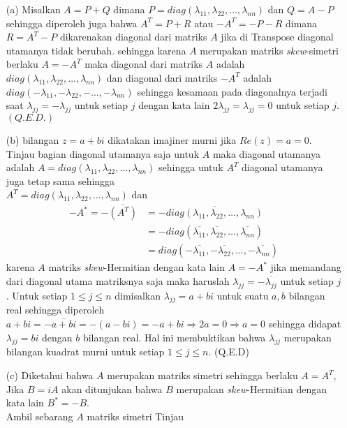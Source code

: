\documentclass[11pt,a4paper]{article}
\theoremstyle{plain}
\theoremstyle{definition}
\theoremstyle{remark}
\begin{document}
\begin{enumerate}
\begin{enumerate}
		\begin{enumerate}
			\item[(a)] Misalkan $A=P+Q$ dimana $P=diag(\lambda_{11},\lambda_{22},\ldots,\lambda_{nn})$ dan $Q=A-P$ sehingga diperoleh juga bahwa $A^{T}=P+R$ atau $-A^{T}=-P-R$ dimana $R=A^{T}-P$ dikarenakan diagonal dari matriks $A$ jika di Transpose diagonal utamanya tidak berubah. sehingga karena $A$ merupakan matriks \textit{skew}-simetri berlaku $A=-A^{T}$ maka diagonal dari matriks $A$ adalah $diag(\lambda_{11},\lambda_{22},\ldots,\lambda_{nn})$ dan diagonal dari matriks $-A^{T}$ adalah $diag(-\lambda_{11},-\lambda_{22},-\ldots,-\lambda_{nn})$ sehingga kesamaan pada diagonalnya terjadi saat $\lambda_{jj}=-\lambda_{jj}$ untuk setiap $j$ dengan kata lain $2 \lambda_{jj}=\lambda_{jj} = 0$ untuk setiap $j$. $(Q.E.D.)$
			\item[(b)] bilangan $z=a+bi$ dikatakan imajiner murni jika $Re(z)=a=0$. Tinjau bagian diagonal utamanya saja untuk $A$ maka diagonal utamanya adalah $A=diag(\lambda_{11},\lambda_{22},\ldots,\lambda_{nn})$ sehingga untuk $A^{T}$ diagonal utamanya juga tetap sama sehingga\\ $A^{T}=diag(\lambda_{11},\lambda_{22},\ldots,\lambda_{nn})$ dan 
			\begin{align*}
			-A^*=-\overline{(A^{T})} &=-\overline{diag(\lambda_{11},\lambda_{22},\ldots,\lambda_{nn})} \\
			&= -diag(\overline{\lambda_{11}},\overline{\lambda_{22}},\ldots,\overline{\lambda_{nn}}) \\
			&= diag(-\overline{\lambda_{11}},-\overline{\lambda_{22}},\ldots,-\overline{\lambda_{nn}})
			\end{align*}
			karena $A$ matriks \textit{skew}-Hermitian dengan kata lain $A=-A^*$ jika memandang dari diagonal utama matriksnya saja maka haruslah $\lambda_{jj}=-\overline{\lambda_{jj}}$ untuk setiap $j$. Untuk setiap $1\le j\le n$ dimisalkan $\lambda_{jj}=a+bi$ untuk suatu $a,b$ bilangan real sehingga diperoleh $a+bi = -\overline{a+bi}=-(a-bi)=-a+bi\Rightarrow 2a=0 \Rightarrow a=0$ sehingga didapat $\lambda_{jj}=bi$ dengan $b$ bilangan real. Hal ini membuktikan bahwa $\lambda_{jj}$ merupakan bilangan kuadrat murni untuk setiap $1\leq j \leq n$. (Q.E.D)
			\item[(c)] Diketahui bahwa $A$ merupakan matriks simetri sehingga berlaku $A=A^{T}$, Jika $B=iA$ akan ditunjukan bahwa $B$ merupakan \textit{skew}-Hermitian dengan kata lain $B^*=-B$.\\
			Ambil sebarang $A$ matriks simetri Tinjau
			\begin{align*}

\end{align*}
\end{enumerate}
\end{enumerate}
\end{enumerate}
\end{document}

